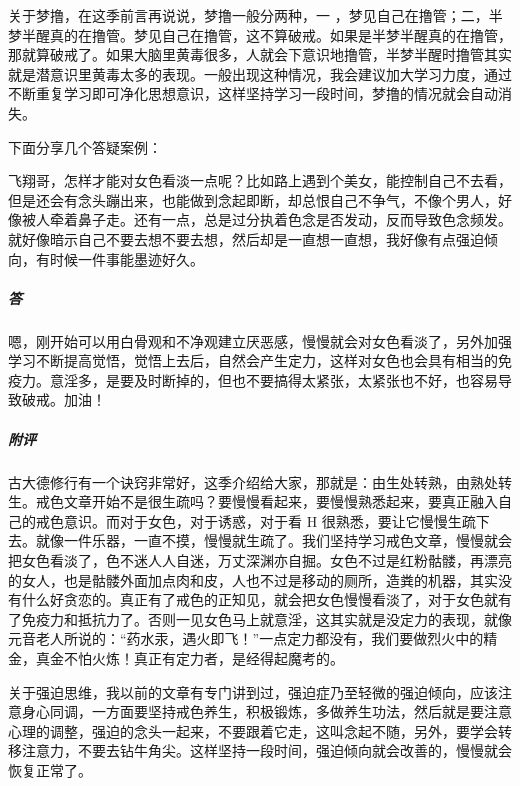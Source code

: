 关于梦撸，在这季前言再说说，梦撸一般分两种，一 ，梦见自己在撸管；二，半梦半醒真的在撸管。梦见自己在撸管，这不算破戒。如果是半梦半醒真的在撸管，那就算破戒了。如果大脑里黄毒很多，人就会下意识地撸管，半梦半醒时撸管其实就是潜意识里黄毒太多的表现。一般出现这种情况，我会建议加大学习力度，通过不断重复学习即可净化思想意识，这样坚持学习一段时间，梦撸的情况就会自动消失。

下面分享几个答疑案例：

\begin{case}
    飞翔哥，怎样才能对女色看淡一点呢？比如路上遇到个美女，能控制自己不去看，但是还会有念头蹦出来，也能做到念起即断，却总恨自己不争气，不像个男人，好像被人牵着鼻子走。还有一点，总是过分执着色念是否发动，反而导致色念频发。就好像暗示自己不要去想不要去想，然后却是一直想一直想，我好像有点强迫倾向，有时候一件事能墨迹好久。
    \subparagraph{答} 嗯，刚开始可以用白骨观和不净观建立厌恶感，慢慢就会对女色看淡了，另外加强学习不断提高觉悟，觉悟上去后，自然会产生定力，这样对女色也会具有相当的免疫力。意淫多，是要及时断掉的，但也不要搞得太紧张，太紧张也不好，也容易导致破戒。加油！
    \subparagraph{附评} 古大德修行有一个诀窍非常好，这季介绍给大家，那就是：由生处转熟，由熟处转生。戒色文章开始不是很生疏吗？要慢慢看起来，要慢慢熟悉起来，要真正融入自己的戒色意识。而对于女色，对于诱惑，对于看 H 很熟悉，要让它慢慢生疏下去。就像一件乐器，一直不摸，慢慢就生疏了。我们坚持学习戒色文章，慢慢就会把女色看淡了，色不迷人人自迷，万丈深渊亦自掘。女色不过是红粉骷髅，再漂亮的女人，也是骷髅外面加点肉和皮，人也不过是移动的厕所，造粪的机器，其实没有什么好贪恋的。真正有了戒色的正知见，就会把女色慢慢看淡了，对于女色就有了免疫力和抵抗力了。否则一见女色马上就意淫，这其实就是没定力的表现，就像元音老人所说的：“药水汞，遇火即飞！”一点定力都没有，我们要做烈火中的精金，真金不怕火炼！真正有定力者，是经得起魔考的。

    关于强迫思维，我以前的文章有专门讲到过，强迫症乃至轻微的强迫倾向，应该注意身心同调，一方面要坚持戒色养生，积极锻炼，多做养生功法，然后就是要注意心理的调整，强迫的念头一起来，不要跟着它走，这叫念起不随，另外，要学会转移注意力，不要去钻牛角尖。这样坚持一段时间，强迫倾向就会改善的，慢慢就会恢复正常了。
\end{case}

